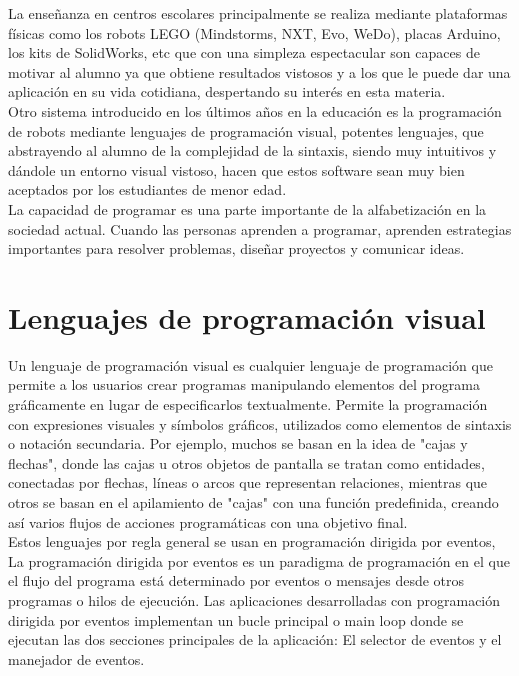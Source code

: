 La enseñanza en centros escolares principalmente se realiza mediante plataformas físicas como los robots LEGO (Mindstorms, NXT, Evo, WeDo), placas Arduino, los kits de SolidWorks, etc que con una simpleza espectacular son capaces de motivar al alumno ya que obtiene resultados vistosos y a los que le puede dar una aplicación en su vida cotidiana, despertando su interés en esta materia.\\
Otro sistema introducido en los últimos años en la educación es la programación de robots mediante lenguajes de programación visual, potentes lenguajes, que abstrayendo al alumno de la complejidad de la sintaxis, siendo muy intuitivos y dándole un entorno visual vistoso, hacen que estos software sean muy bien aceptados por los estudiantes de menor edad.\\

La capacidad de programar es una parte importante de la alfabetización en la sociedad actual. Cuando las personas aprenden a programar, aprenden estrategias importantes para resolver problemas, diseñar proyectos y comunicar ideas.

\section{Lenguajes de programación visual}
\label{sec:lenguajes}

Un lenguaje de programación visual es cualquier lenguaje de programación que permite a los usuarios crear programas manipulando elementos del programa gráficamente en lugar de especificarlos textualmente. Permite la programación con expresiones visuales y símbolos gráficos, utilizados como elementos de sintaxis o notación secundaria. Por ejemplo, muchos se basan en la idea de "cajas y flechas", donde las cajas u otros objetos de pantalla se tratan como entidades, conectadas por flechas, líneas o arcos que representan relaciones, mientras que otros se basan en el apilamiento de "cajas" con una función predefinida, creando así varios flujos de acciones programáticas con una objetivo final.\\

Estos lenguajes por regla general se usan en programación dirigida por eventos, La programación dirigida por eventos es un paradigma de programación en el que el flujo del programa está determinado por eventos o mensajes desde otros programas o hilos de ejecución.
Las aplicaciones desarrolladas con programación dirigida por eventos implementan un bucle principal o main loop donde se ejecutan las dos secciones principales de la aplicación: El selector de eventos y el manejador de eventos.\\

